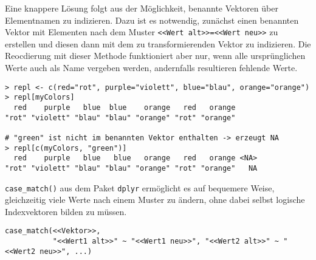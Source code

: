 Eine knappere Lösung folgt aus der Möglichkeit, benannte Vektoren über Elementnamen zu indizieren. Dazu ist es notwendig, zunächst einen benannten Vektor mit Elementen nach dem Muster \lstinline!<<Wert alt>>=<<Wert neu>>! zu erstellen und diesen dann mit dem zu transformierenden Vektor zu indizieren. Die Reocdierung mit dieser Methode funktioniert aber nur, wenn alle ursprünglichen Werte auch als Name vergeben werden, andernfalls resultieren fehlende Werte.
\begin{lstlisting}
> repl <- c(red="rot", purple="violett", blue="blau", orange="orange")
> repl[myColors]
  red    purple   blue  blue    orange   red   orange 
"rot" "violett" "blau" "blau" "orange" "rot" "orange"

# "green" ist nicht im benannten Vektor enthalten -> erzeugt NA
> repl[c(myColors, "green")]
  red    purple   blue   blue   orange   red   orange <NA>
"rot" "violett" "blau" "blau" "orange" "rot" "orange"   NA
\end{lstlisting}

%

\lstinline!case_match()! aus dem Paket \lstinline!dplyr! \cite{Wickham2014c} ermöglicht es auf bequemere Weise, gleichzeitig viele Werte nach einem Muster zu ändern, ohne dabei selbst logische Indexvektoren bilden zu müssen.
\begin{lstlisting}
case_match(<<Vektor>>,
           "<<Wert1 alt>>" ~ "<<Wert1 neu>>", "<<Wert2 alt>>" ~ "<<Wert2 neu>>", ...)
\end{lstlisting}

